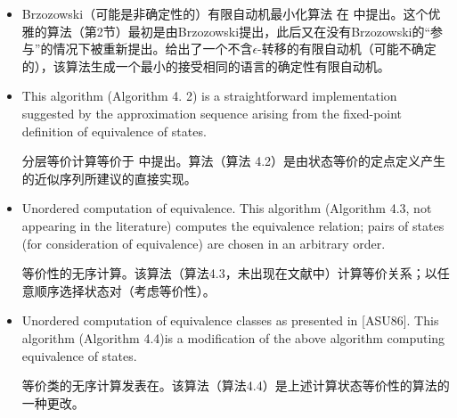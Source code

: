 \begin{itemize}
    \item Brzozowski（可能是非确定性的）有限自动机最小化算法 在 \cite{Brzo62} 中提出。这个优雅的算法（第2节）最初是由Brzozowski提出，此后又在没有Brzozowski的“参与”的情况下被重新提出。给出了一个不含$\epsilon$-转移的有限自动机（可能不确定的），该算法生成一个最小的接受相同的语言的确定性有限自动机。

    \item This algorithm (Algorithm 4. 2) is a straightforward implementation suggested by the approximation sequence arising from the fixed-point definition of equivalence of states. 

    分层等价计算等价于 \cite{Wood87, Moor56, Brau88, Urba89} 中提出。算法（算法 4.2）是由状态等价的定点定义产生的近似序列所建议的直接实现。

    \item Unordered computation of equivalence. This algorithm (Algorithm 4.3, not appearing in the literature) computes the equivalence relation; pairs of states (for consideration of equivalence) are chosen in an arbitrary order.

    等价性的无序计算。该算法（算法4.3，未出现在文献中）计算等价关系；以任意顺序选择状态对（考虑等价性）。

    \item Unordered computation of equivalence classes as presented in [ASU86]. This algorithm (Algorithm 4.4)is a modification of the above algorithm computing equivalence of states.

    等价类的无序计算发表在\cite{ASU86}。该算法（算法4.4）是上述计算状态等价性的算法的一种更改。

\end{itemize}

